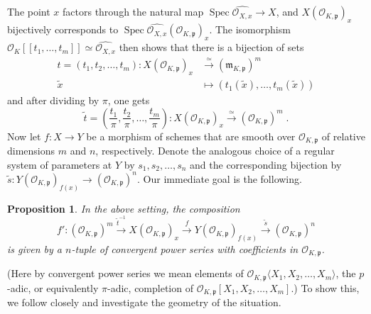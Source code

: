 \documentclass[11pt,oneside]{amsart}
\theoremstyle{plain}
\newtheorem{proposition}[theorem]{Proposition}
\theoremstyle{definition}
\DeclareMathOperator{\spec}{Spec} \DeclareMathOperator{\sgn}{sign}
\def\oh{\mathcal{O}}
\begin{document}
The point $x$ factors through the natural map $\spec{\widehat{\oh_{X, x}}} \rightarrow X$, and $X(\oh_{K, \mathfrak{p}})_x$ bijectively corresponds to $\spec{\widehat{\oh_{X, x}}}(\oh_{K,\mathfrak{p}})_x$. The isomorphism $  \oh_K[[t_1, \dots, t_m]]\simeq \widehat{\oh_{X, x}}$ then shows that there is a bijection of sets
\begin{align*}t=(t_1, t_2, \dots, t_m):X(\oh_{K, \mathfrak{p}})_x &\stackrel{\simeq}{\longrightarrow}  (\mathfrak{m}_{K, \mathfrak{p}})^{m} \\ 
\tilde{x}\;\; &\longmapsto  (t_1(\tilde{x}), \dots, t_m(\tilde{x}))
\end{align*}  
and after dividing by $\pi$, one gets
\begin{equation} \label{eq:tilde_t} \tilde{t}=\left(\frac{t_1}{\pi}, \frac{t_2}{\pi}, \dots, \frac{t_m}{\pi}\right):X(\oh_{K, \mathfrak{p}})_x \stackrel{\simeq}{\longrightarrow}  (\oh_{K, \mathfrak{p}})^{m}\;.
\end{equation} 
Now let $f: X \rightarrow Y$ be a morphism of schemes that are smooth over $\oh_{K, \mathfrak{p}}$ of relative dimensions $m$ and $n$, respectively. Denote the analogous choice of a regular system of parameters at $Y$ by $s_1, s_2, \dots, s_{n}$ and the corresponding bijection by $\tilde{s}: Y(\oh_{K, \mathfrak{p}})_{f(x)} \rightarrow (\oh_{K, \mathfrak{p}})^{n}$. Our immediate goal is the following.

\begin{proposition}\label{prop:blowup}
In the above setting, the composition $$f':(\oh_{K, \mathfrak{p}})^m\stackrel{\tilde{t}^{-1}}{\longrightarrow} X(\oh_{K, \mathfrak{p}})_x \stackrel{f}{\longrightarrow} Y(\oh_{K, \mathfrak{p}})_{f(x)} \stackrel{\tilde{s}}{\longrightarrow}(\oh_{K, \mathfrak{p}})^{n}$$
is given by a $n$-tuple of convergent power series with coefficients in $\oh_{K, \mathfrak{p}}$.
\end{proposition}

(Here by convergent power series we mean elements of $\oh_{K, \mathfrak{p}}\langle X_1, X_2, \dots, X_m\rangle$, the $p$-adic, or equivalently $\pi$-adic, completion of $\oh_{K, \mathfrak{p}}[X_1, X_2, \dots, X_m]$.) To show this, we follow closely \cite[\S 3]{EL19} and investigate the geometry of the situation.
\end{document}
